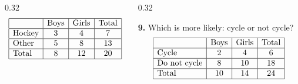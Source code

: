 \documentclass[aspectratio=169,12pt]{beamer}
\newcommand{\MMProblem}[2]{\begin{MMProblemCard}\raggedright\small\textbf{#1.} #2\par\end{MMProblemCard}}
\begin{document}
\begin{frame}[t]
\begin{columns}[T,onlytextwidth]
\begin{column}{0.32\textwidth}
{\[
\begin{array}{|l|c|c|c|}
\hline
 & \text{Boys} & \text{Girls} & \text{Total} \\\hline
\text{Hockey} & 3 & 4 & 7 \\\hline
\text{Other} & 5 & 8 & 13 \\\hline
\text{Total} & 8 & 12 & 20 \\\hline
\end{array}
\]}\end{column}
\begin{column}{0.32\textwidth}\MMProblem{9}{Which is more likely: cycle or not cycle?
\[
\begin{array}{|l|c|c|c|}
\hline
 & \text{Boys} & \text{Girls} & \text{Total} \\\hline
\text{Cycle} & 2 & 4 & 6 \\\hline
\text{Do not cycle} & 8 & 10 & 18 \\\hline
\text{Total} & 10 & 14 & 24 \\\hline
\end{array}
\]}\end{column}
\end{columns}
\end{frame}
\end{document}
